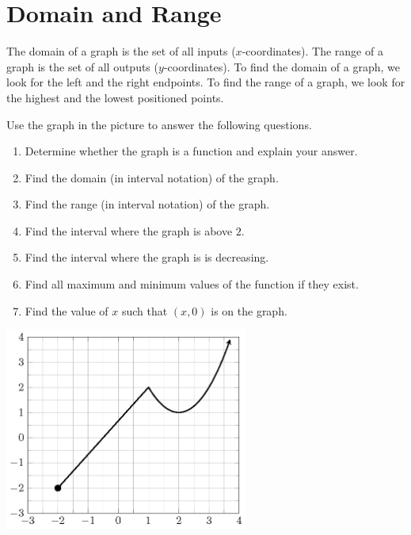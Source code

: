 \documentclass[en,12pt]{elegantbook}
\providecommand{\tightlist}{%
  \setlength{\itemsep}{0pt}\setlength{\parskip}{0pt}}
\let\BeginKnitrBlock\begin \let\EndKnitrBlock\end
\begin{document}
\hypertarget{domain-and-range}{%
\section{Domain and Range}\label{domain-and-range}}

The domain of a graph is the set of all inputs (\(x\)-coordinates). The range of a graph is the set of all outputs (\(y\)-coordinates).
To find the domain of a graph, we look for the left and the right endpoints. To find the range of a graph, we look for the highest and the lowest positioned points.

\BeginKnitrBlock{example}
\protect\hypertarget{exm:unnamed-chunk-249}{}{\label{exm:unnamed-chunk-249} }
Use the graph in the picture to answer the following questions.

\begin{enumerate}
\def\labelenumi{\arabic{enumi}.}
\tightlist
\item
  Determine whether the graph is a function and explain your answer.\\
\item
  Find the domain (in interval notation) of the graph.\\
\item
  Find the range (in interval notation) of the graph.\\
\item
  Find the interval where the graph is above \(2\).\\
\item
  Find the interval where the graph is is decreasing.\\
\item
  Find all maximum and minimum values of the function if they exist.\\
\item
  Find the value of \(x\) such that \((x, 0)\) is on the graph.
\end{enumerate}

\includegraphics[width=0.6\textwidth,height=\textheight]{figs/function-example-quadratic.png}\\
\EndKnitrBlock{example}
\end{document}
